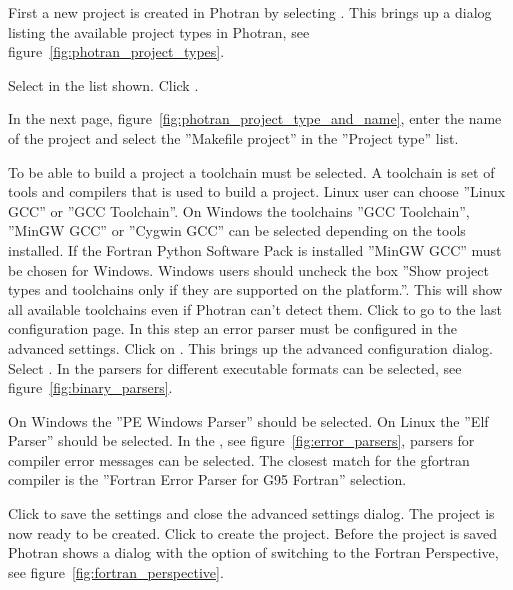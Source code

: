 First a new project is created in Photran by selecting
. This brings up a dialog listing the
available project types in Photran, see
figure~\ref{fig:photran_project_types}.


\noindent Select  in the list shown. Click .

In the next page, figure~\ref{fig:photran_project_type_and_name}, enter the name of the project and select the ''Makefile project'' in the ''Project type'' list.


\noindent To be able to build a project a toolchain must be selected. A toolchain is set of tools and compilers that is used to build a project. Linux user can choose ''Linux GCC'' or ''GCC Toolchain''. On Windows the toolchains ''GCC Toolchain'', ''MinGW GCC'' or ''Cygwin GCC'' can be selected depending on the tools installed. If the Fortran Python Software Pack is installed ''MinGW GCC'' must be chosen for Windows. Windows users should uncheck the box ''Show project types and toolchains only if they are supported on the platform.''. This will show all available toolchains even if Photran can't detect them. Click  to go to the last configuration page. In this step an error parser must be configured in the advanced settings. Click on . This brings up the advanced configuration dialog. Select . In the  parsers for different executable formats can be selected, see figure~\ref{fig:binary_parsers}.


On Windows the ''PE Windows Parser'' should be selected. On Linux the ''Elf Parser'' should be selected. In the , see figure~\ref{fig:error_parsers}, parsers for compiler error messages can be selected. The closest match for the gfortran compiler is the ''Fortran Error Parser for G95 Fortran'' selection.


Click  to save the settings and close the advanced settings dialog. The project is now ready to be created. Click  to create the project. Before the project is saved Photran shows a dialog with the option of switching to the Fortran Perspective, see figure~\ref{fig:fortran_perspective}.

